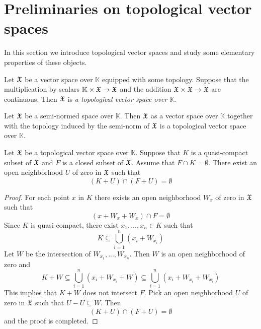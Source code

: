 \section{Preliminaries on topological vector spaces}
\noindent
In this section we introduce topological vector spaces and study some elementary properties of these objects.

\begin{definition}
Let ${\mathfrak X}$ be a vector space over $\mathbb{K}$ equipped with some topology. Suppose that the multiplication by scalars $\mathbb{K}\times {\mathfrak X} \rightarrow {\mathfrak X}$ and the addition ${\mathfrak X}\times {\mathfrak X}\rightarrow {\mathfrak X}$ are continuous. Then ${\mathfrak X}$ is \textit{a topological vector space over $\mathbb{K}$}.
\end{definition}

\begin{example}\label{example:normed_spaces_are_topological_vector_spaces}
Let ${\mathfrak X}$ be a semi-normed space over $\mathbb{K}$. Then ${\mathfrak X}$ as a vector space over $\mathbb{K}$ together with the topology induced by the semi-norm of ${\mathfrak X}$ is a topological vector space over $\mathbb{K}$.     
\end{example}

\begin{theorem}\label{theorem:separation_for_topological_vector_spaces}
Let ${\mathfrak X}$ be a topological vector space over $\mathbb{K}$. Suppose that $K$ is a quasi-compact subset of ${\mathfrak X}$ and $F$ is a closed subset of ${\mathfrak X}$. Assume that $F\cap K = \emptyset$. There exist an open neighborhood $U$ of zero in ${\mathfrak X}$ such that
$$\left(K + U\right) \cap \left(F + U\right) = \emptyset$$
\end{theorem}
\begin{proof}
For each point $x$ in $K$ there exists an open neighborhood $W_x$ of zero in ${\mathfrak X}$ such that 
$$\left(x + W_x + W_x\right) \cap F = \emptyset$$
Since $K$ is quasi-compact, there exist $x_1,...,x_n\in K$ such that
$$K \subseteq \bigcup_{i=1}^n\left(x_i + W_{x_i}\right)$$
Let $W$ be the intersection of $W_{x_1},...,W_{x_n}$. Then $W$ is an open neighborhood of zero and 
$$K + W \subseteq \bigcup_{i=1}^n\left(x_i + W_{x_i} + W\right)\subseteq \bigcup_{i=1}^n\left(x_i + W_{x_i} + W_{x_i}\right)$$
This implies that $K + W$ does not intersect $F$. Pick an open neighborhood $U$ of zero in ${\mathfrak X}$ such that $U - U \subseteq W$. Then
$$\left(K + U\right) \cap \left(F + U\right) = \emptyset$$
and the proof is completed.
\end{proof}


